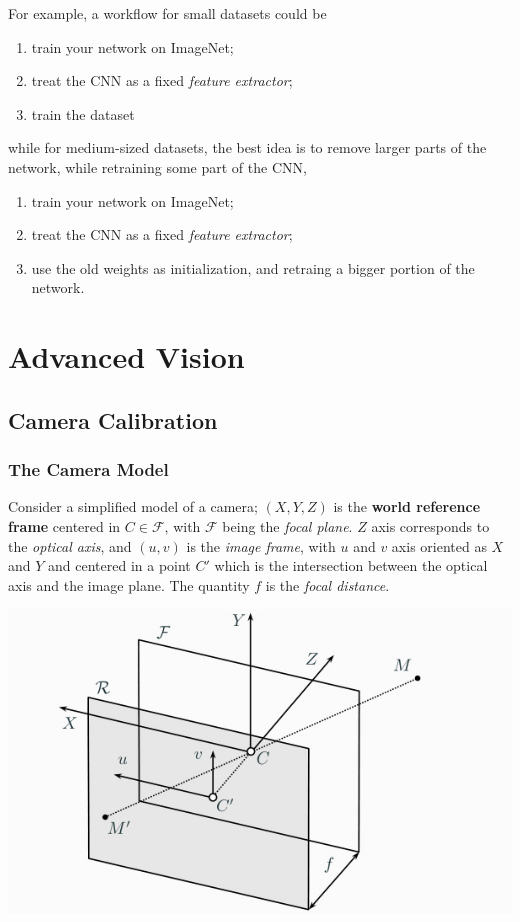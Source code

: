 \documentclass[10pt]{report}
\begin{document}
For example, a workflow for small datasets could be

\begin{enumerate}
\item train your network on ImageNet;
\item treat the CNN as a fixed \emph{feature extractor};
\item train the dataset
\end{enumerate}

while for medium-sized datasets, the best idea is to remove larger parts
of the network, while retraining some part of the CNN,

\begin{enumerate}
\item train your network on ImageNet;
\item treat the CNN as a fixed \emph{feature extractor};
\item use the old weights as initialization, and retraing a bigger portion
of the network.
\end{enumerate}

\part{Advanced Vision}
\label{sec:org47d0e24}
\chapter{Camera Calibration}
\label{sec:org46414c7}
\section{The Camera Model}
\label{sec:orgc7089ee}
Consider a simplified model of a camera; \((X, Y, Z)\) is the \textbf{world
reference frame} centered in \(C \in \mathcal{F}\), with \(\mathcal{F}\)
being the \emph{focal plane}. \(Z\) axis corresponds to the \emph{optical axis},
and \((u, v)\) is the \emph{image frame}, with \(u\) and \(v\) axis oriented
as \(X\) and \(Y\) and centered in a point \(C'\) which is the
intersection between the optical axis and the image plane. The quantity
\(f\) is the \emph{focal distance}.

\begin{center}
\includegraphics[width=.9\linewidth]{./pics/cal/camera-model.jpg}
\end{center}
\end{document}
